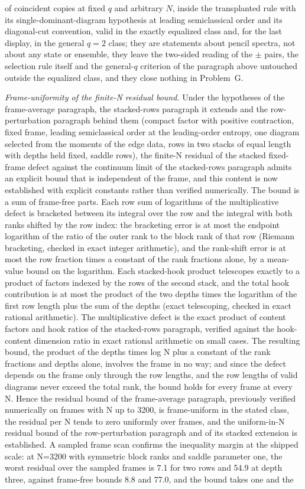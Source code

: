 of coincident copies at fixed \(q\) and arbitrary \(N\), inside the transplanted rule with its single-dominant-diagram hypothesis at leading semiclassical order and its diagonal-cut convention, valid in the exactly equalized class and, for the last display, in the general \(q=2\) class; they are statements about pencil spectra, not about any state or ensemble, they leave the two-sided reading of the \(\pm\) pairs, the selection rule itself and the general-\(q\) criterion of the paragraph above untouched outside the equalized class, and they close nothing in Problem~G.

\emph{Frame-uniformity of the finite-N residual bound.} Under the hypotheses of the frame-average paragraph, the stacked-rows paragraph it extends and the row-perturbation paragraph behind them (compact factor with positive contraction, fixed frame, leading semiclassical order at the leading-order entropy, one diagram selected from the moments of the edge data, rows in two stacks of equal length with depths held fixed, saddle rows), the finite-N residual of the stacked fixed-frame defect against the continuum limit of the stacked-rows paragraph admits an explicit bound that is independent of the frame, and this content is now established with explicit constants rather than verified numerically. The bound is a sum of frame-free parts. Each row sum of logarithms of the multiplicative defect is bracketed between its integral over the row and the integral with both ranks shifted by the row index: the bracketing error is at most the endpoint logarithm of the ratio of the outer rank to the block rank of that row (Riemann bracketing, checked in exact integer arithmetic), and the rank-shift error is at most the row fraction times a constant of the rank fractions alone, by a mean-value bound on the logarithm. Each stacked-hook product telescopes exactly to a product of factors indexed by the rows of the second stack, and the total hook contribution is at most the product of the two depths times the logarithm of the first row length plus the sum of the depths (exact telescoping, checked in exact rational arithmetic). The multiplicative defect is the exact product of content factors and hook ratios of the stacked-rows paragraph, verified against the hook-content dimension ratio in exact rational arithmetic on small cases. The resulting bound, the product of the depths times log N plus a constant of the rank fractions and depths alone, involves the frame in no way; and since the defect depends on the frame only through the row lengths, and the row lengths of valid diagrams never exceed the total rank, the bound holds for every frame at every N. Hence the residual bound of the frame-average paragraph, previously verified numerically on frames with N up to 3200, is frame-uniform in the stated class, the residual per N tends to zero uniformly over frames, and the uniform-in-N residual bound of the row-perturbation paragraph and of its stacked extension is established. A sampled frame scan confirms the inequality margin at the shipped scale: at N=3200 with symmetric block ranks and saddle parameter one, the worst residual over the sampled frames is 7.1 for two rows and 54.9 at depth three, against frame-free bounds 8.8 and 77.0, and the bound takes one and the 
